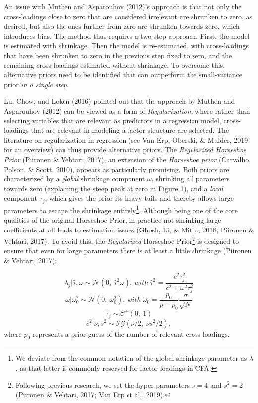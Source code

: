 \documentclass[
  english,
  man]{apa6}
\begin{document}
An issue with Muthen and Asparouhov (2012)'s approach is that not only the cross-loadings
close to zero that are considered irrelevant are shrunken to zero, as
desired, but also the ones further from zero are shrunken
towards zero, which introduces bias. The method thus requires a two-step
approach. First, the model is estimated with shrinkage. Then the model
is re-estimated, with cross-loadings that have been shrunken to zero in
the previous step fixed to zero, and the remaining cross-loadings
estimated without shrinkage. To overcome this, alternative priors need
to be identified that can outperform the small-variance prior \emph{in a
single step}.

Lu, Chow, and Loken (2016) pointed out that the approach by
Muthen and Asparouhov (2012) can be viewed as a form of \emph{Regularization}, where
rather than selecting variables that are relevant as predictors in a
regression model, cross-loadings that are relevant in modeling a factor
structure are selected. The literature on regularization in regression
(see Van Erp, Oberski, \& Mulder, 2019 for an overview) can thus provide
alternative priors. The \emph{Regularized Horseshoe Prior}
(Piironen \& Vehtari, 2017), an extension of the \emph{Horseshoe prior}
(Carvalho, Polson, \& Scott, 2010), appears as particularly promising. Both
priors are characterized by a \emph{global} shrinkage component \(\omega\),
shrinking all parameters towards zero (explaining the steep peak at zero
in Figure 1), and a \emph{local} component \(\tau_j\), which
gives the prior its heavy tails and thereby allows large parameters to
escape the shrinkage entirely\footnote{We deviate from the common notation of the global shrinkage
  parameter as \(\lambda\), as that letter is commonly reserved for
  factor loadings in CFA.}. Although being one of the core
qualities of the original Horseshoe Prior, in practice not shrinking
large coefficients at all leads to estimation issues (Ghosh, Li, \& Mitra, 2018; Piironen \& Vehtari, 2017). To
avoid this, the \emph{Regularized} Horseshoe Prior\footnote{Following previous research, we set the hyper-parameters \(\nu = 4\)
  and \(s^2 = 2\) (Piironen \& Vehtari, 2017; Van Erp et al., 2019).} is designed to ensure
that even for large parameters there is at least a little shrinkage
(Piironen \& Vehtari, 2017):

\[\lambda_j | \hat{\tau}, \omega \sim \mathcal{N}(0, \ \hat{\tau}^2 \omega), \ with \ \hat{\tau}^2 = \frac{c^2\tau_j^2}{c^2 + \omega^2 \tau_j^2}\]
\[\omega | \omega_0^2 \sim \mathcal{N}(0,\  \omega_0^2), \ with \  \omega_0 = \frac{p_0}{p-p_0}\frac{\sigma}{\sqrt{N}}\]
\[\tau_j \sim \mathcal{C^+}(0, \ 1)\]
\[c^2 | \nu, s^2 \sim \mathcal{IG}(\nu/2, \  \nu s^2/2),\] where \(p_0\)
represents a prior guess of the number of relevant cross-loadings.
\end{document}
